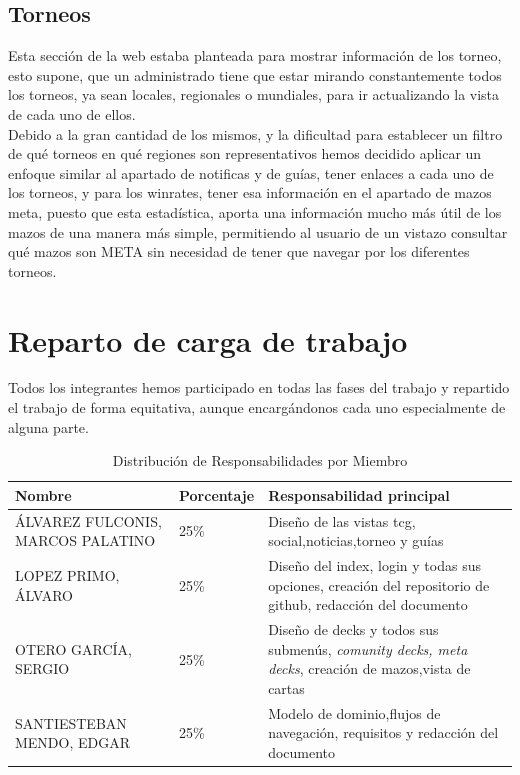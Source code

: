 \documentclass[10pt]{article}
\begin{document}
		\subsection{Torneos}
			Esta sección de la web estaba planteada para mostrar información de los torneo, esto supone, que un administrado tiene que estar mirando constantemente todos los torneos, ya sean locales, regionales o mundiales, para ir actualizando la vista de cada uno de ellos. \\ 
			Debido a la gran cantidad de los mismos, y  la dificultad para establecer un filtro de qué torneos en qué regiones son representativos hemos decidido aplicar un enfoque similar al apartado de notificas y de guías, tener enlaces a cada uno de los torneos, y para los winrates, tener esa información en el apartado de mazos meta, puesto que esta estadística, aporta una información mucho más útil de los mazos  de una manera más simple, permitiendo al usuario de un vistazo consultar qué mazos son META sin necesidad de tener que navegar por los diferentes torneos.
			
	\newpage
	\section{Reparto de carga de trabajo}
	Todos los integrantes hemos participado en todas las fases del trabajo y repartido el trabajo de forma equitativa, aunque encargándonos cada uno especialmente de alguna parte.\\
	
	\begin{table}[h]
		\centering
		\caption{Distribución de Responsabilidades por Miembro}
		\begin{tabularx}{\textwidth}{llX} 
			\toprule
			\textbf{Nombre} & \textbf{Porcentaje} & \textbf{Responsabilidad principal} \\
			\midrule
			ÁLVAREZ FULCONIS, MARCOS PALATINO      	& 25\%                & Diseño de las vistas tcg, social,noticias,torneo y guías\\
			LOPEZ PRIMO, ÁLVARO      				& 25\%                & Diseño del index, login y todas sus opciones, creación del repositorio de github, redacción del documento\\
			OTERO GARCÍA, SERGIO     				& 25\%                & Diseño de decks y todos sus submenús, \textit{comunity decks, meta decks}, creación de mazos,vista de cartas\\
			SANTIESTEBAN MENDO, EDGAR    			& 25\%                & Modelo de dominio,flujos de navegación, requisitos y redacción del documento\\
			\bottomrule
		\end{tabularx}
	\end{table}
	
\end{document}
